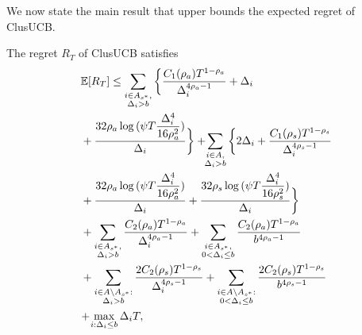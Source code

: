 	
We now state the main result that upper bounds the expected regret of ClusUCB.
	
\begin{theorem}
\label{Result:Theorem:1}
The regret $R_T$ of ClusUCB satisfies
\begin{align*}
&\mathbb{E} [R_{T}]\leq 
\sum\limits_{\substack{i\in A_{s^{*}},\\\Delta_{i} > b}}\bigg\lbrace \dfrac{C_1(\rho_{a})T^{1-\rho_{a}}}{\Delta_{i}^{4\rho_{a}-1}} + \Delta_{i}\\
& + \frac{32\rho_{a}\log{(\psi T\dfrac{\Delta_{i}^{4}}{16\rho_{a}^{2}})}}{\Delta_{i}} \bigg\rbrace
 + \! \! \sum\limits_{\substack{i\in A,\\\Delta_{i} > b}} \bigg\lbrace 2\Delta_{i}+
\dfrac{C_1(\rho_{s})T^{1-\rho_{s}}}{\Delta_{i}^{4\rho_{s}-1}} \\
&+ \frac{32\rho_{a}\log{(\psi T\dfrac{\Delta_{i}^{4}}{16\rho_{a}^{2}})}}{\Delta_{i}} 
+ \dfrac{32\rho_{s}\log{(\psi T\dfrac{\Delta_{i}^{4}}{16\rho_{s}^{2}})}}{\Delta_{i}}\bigg\rbrace \\
&+ \sum\limits_{\substack{i\in A_{s^{*}},\\ \Delta_{i} > b}} 
\frac{C_2(\rho_{a})T^{1-\rho_{a}}}{\Delta_{i}^{4\rho_{a}-1}}
+\sum\limits_{\substack{i\in A_{s^{*}},\\0 < \Delta_{i}\leq b}}\frac{C_2(\rho_a)T^{1-\rho_{a}}}{b^{4\rho_{a} -1}}\\ 
&+ \sum_{\substack{i\in A\setminus A_{s^*}:\\\Delta_{i}> b}}\dfrac{2C_{2}(\rho_{s})T^{1-\rho_{s}}}{\Delta_{i}^{4\rho_{s}-1}} +\sum_{\substack{i\in A \setminus A_{s^*}:\\ 0 < \Delta_{i} \leq b}}\dfrac{2C_{2}(\rho_{s})T^{1-\rho_{s}}}{b^{4\rho_{s}-1}}\\
& \!+\! \max\limits_{i:\Delta_{i}\leq b}\Delta_{i}T, 
\end{align*}

\end{theorem}
